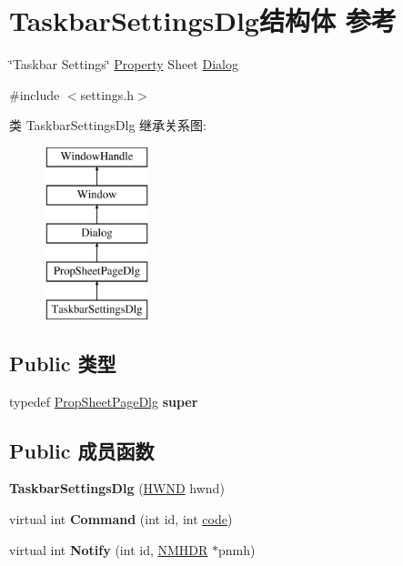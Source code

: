 \hypertarget{struct_taskbar_settings_dlg}{}\section{Taskbar\+Settings\+Dlg结构体 参考}
\label{struct_taskbar_settings_dlg}


\char`\"{}\+Taskbar Settings\char`\"{} \hyperlink{struct_property}{Property} Sheet \hyperlink{struct_dialog}{Dialog}  




{\ttfamily \#include $<$settings.\+h$>$}

类 Taskbar\+Settings\+Dlg 继承关系图\+:\begin{figure}[H]
\begin{center}
\leavevmode
\includegraphics[height=5.000000cm]{struct_taskbar_settings_dlg}
\end{center}
\end{figure}
\subsection*{Public 类型}
\begin{DoxyCompactItemize}
\item 
\mbox{\label{struct_taskbar_settings_dlg_a3f3b2f0dd46c9fbd6fcc59fe9abe8cf5}} 
typedef \hyperlink{struct_prop_sheet_page_dlg}{Prop\+Sheet\+Page\+Dlg} {\bfseries super}
\end{DoxyCompactItemize}
\subsection*{Public 成员函数}
\begin{DoxyCompactItemize}
\item 
\mbox{\label{struct_taskbar_settings_dlg_abdfea610ecaf430f486a588db3fd2cba}} 
{\bfseries Taskbar\+Settings\+Dlg} (\hyperlink{interfacevoid}{H\+W\+ND} hwnd)
\item 
\mbox{\label{struct_taskbar_settings_dlg_a9e2efc2ab87ff94e6f521922b60ef2f5}} 
virtual int {\bfseries Command} (int id, int \hyperlink{structcode}{code})
\item 
\mbox{\label{struct_taskbar_settings_dlg_ad3dec460afdefb8fc031c358c81589bf}} 
virtual int {\bfseries Notify} (int id, \hyperlink{structtag_n_m_h_d_r}{N\+M\+H\+DR} $\ast$pnmh)
\end{DoxyCompactItemize}

